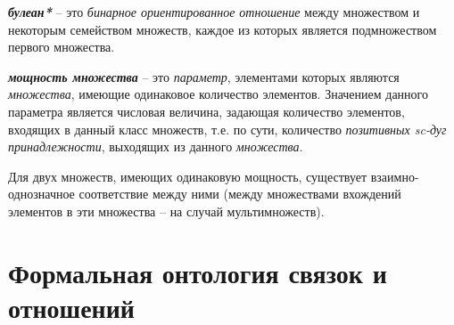 \begin{SCn}
\end{SCn}
	
\textbf{\textit{булеан*}} – это \textit{бинарное ориентированное отношение} между множеством и некоторым семейством множеств, каждое из которых является подмножеством первого множества.

\begin{SCn}
\end{SCn}

\textbf{\textit{мощность множества}} – это \textit{параметр}, элементами которых являются \textit{множества}, имеющие одинаковое количество элементов. Значением данного параметра является числовая величина, задающая количество элементов, входящих в данный класс множеств, т.е. по сути, количество \textit{позитивных sc-дуг принадлежности}, выходящих из данного \textit{множества}.
	
	Для двух множеств, имеющих одинаковую мощность, существует взаимно-однозначное соответствие между ними (между множествами вхождений элементов в эти множества – на случай мультимножеств).

\section{Формальная онтология связок и отношений}

